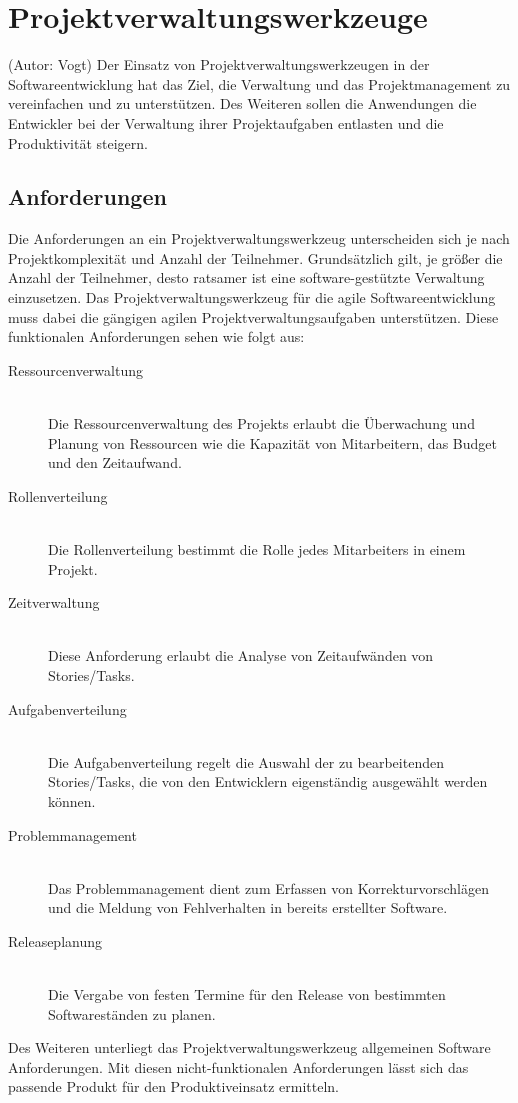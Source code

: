 \section{Projektverwaltungswerkzeuge}
(Autor: Vogt) Der Einsatz von Projektverwaltungswerkzeugen in der Softwareentwicklung hat das Ziel, die Verwaltung und das Projektmanagement zu vereinfachen und zu unterstützen. Des Weiteren sollen die Anwendungen die Entwickler bei der Verwaltung ihrer Projektaufgaben entlasten und die Produktivität steigern.\\

\subsection{Anforderungen}
Die Anforderungen an ein Projektverwaltungswerkzeug unterscheiden sich je nach Projektkomplexität und Anzahl der Teilnehmer. Grundsätzlich gilt, je größer die Anzahl der Teilnehmer, desto ratsamer ist eine software-gestützte Verwaltung einzusetzen.
Das Projektverwaltungswerkzeug für die agile Softwareentwicklung muss dabei die gängigen agilen Projektverwaltungsaufgaben unterstützen. Diese funktionalen Anforderungen sehen wie folgt aus:

\begin{description}
	\item[Ressourcenverwaltung]\hspace*{1em}\\
Die Ressourcenverwaltung des Projekts erlaubt die Überwachung und Planung von Ressourcen wie die Kapazität von Mitarbeitern, das Budget und den Zeitaufwand.
	\item[Rollenverteilung]\hspace*{1em}\\
Die Rollenverteilung bestimmt die Rolle jedes Mitarbeiters in einem Projekt.
	\item[Zeitverwaltung]\hspace*{1em}\\
Diese Anforderung erlaubt die Analyse von Zeitaufwänden von Stories/Tasks.
	\item[Aufgabenverteilung]\hspace*{1em}\\
Die Aufgabenverteilung regelt die Auswahl der zu bearbeitenden Stories/Tasks, die von den Entwicklern eigenständig ausgewählt werden können.
	\item[Problemmanagement]\hspace*{1em}\\
Das Problemmanagement dient zum Erfassen von Korrekturvorschlägen und die Meldung von Fehlverhalten in bereits erstellter Software. 
	\item[Releaseplanung]\hspace*{1em}\\
Die Vergabe von festen Termine für den Release von bestimmten Softwareständen zu planen.\\
\end{description}
Des Weiteren unterliegt das Projektverwaltungswerkzeug allgemeinen Software Anforderungen. Mit diesen nicht-funktionalen Anforderungen lässt sich das passende Produkt für den Produktiveinsatz ermitteln.


